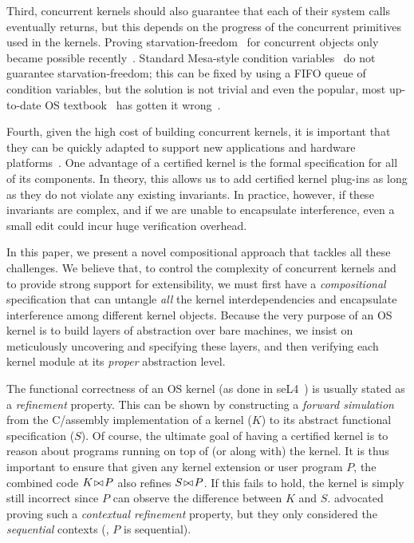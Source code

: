 Third, concurrent kernels should also guarantee that each of their
system calls eventually returns, but this depends on the progress of
the concurrent primitives used in the kernels. Proving
starvation-freedom~\cite{Herlihy08book} for concurrent objects only
became possible recently~\cite{lili16}.  Standard Mesa-style condition
variables~\cite{lampson80} do not guarantee starvation-freedom; this
can be fixed by using a FIFO queue of condition variables, but the
solution is not trivial and even the popular, most up-to-date OS
textbook~\cite[fig~5.14]{ospp11} has gotten it
wrong~\cite{anderson16}.

Fourth, given the high cost of building concurrent kernels, it is
important that they can be quickly adapted to support new applications
and hardware platforms~\cite{bershad95,engler95,hunt07,unikernel13}.
One advantage of a certified kernel is the formal specification for
all of its components. In theory, this allows us to add certified
kernel plug-ins as long as they do not violate any existing
invariants.  In practice, however, if these invariants are complex,
and if we are unable to encapsulate interference, even a small edit
could incur huge verification overhead.

In this paper, we present a novel compositional approach that tackles
all these challenges. We believe that, to control the complexity of
concurrent kernels and to provide strong support for extensibility, we
must first have a {\em compositional} specification that can untangle
{\em all} the kernel interdependencies and encapsulate interference
among different kernel objects. Because the very purpose of an OS
kernel is to build layers of abstraction over bare machines, we insist
on meticulously uncovering and specifying these layers, and then
verifying each kernel module at its {\em proper} abstraction level.

The functional correctness of an OS kernel (as done in
seL4~\cite{klein14}) is usually stated as a {\em refinement}
property. This can be shown by constructing a {\em forward
  simulation}~\cite{Lynch95} from the C/assembly implementation of a
kernel ($K$) to its abstract functional specification ($S$). Of
course, the ultimate goal of having a certified kernel is to reason
about programs running on top of (or along with) the kernel. It is
thus important to ensure that given any kernel extension or user
program $P$, the combined code $K\!\bowtie\!{}P$ also refines
$S\!\bowtie\!{}P$. If this fails to hold, the kernel is simply still
incorrect since $P$ can observe the difference between $K$
and $S$. \citet{dscal15} advocated proving such a {\em
contextual refinement} property, but they only considered the {\em
sequential} contexts (\ie, $P$ is sequential).

